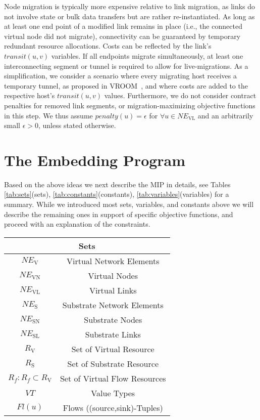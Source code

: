 \documentclass[conference,10pt]{IEEEtran}
\newcommand{\mrm}{\mathrm}
\begin{document}
Node migration is typically more expensive relative to
link migration, as links do not involve state or bulk data transfers
but are rather re-instantiated.
As long as at least one end point of a modified link remains in place (i.e., the connected virtual node did not migrate), connectivity can be guaranteed by temporary redundant resource allocations. Costs can be reflected by the link's $transit(u,v)$ variables.
If all endpoints migrate simultaneously, at least one interconnecting segment or tunnel is required to allow for live-migrations.
As a simplification, we consider a scenario where every migrating host receives a temporary tunnel, as proposed in VROOM~\cite{vroom}, and where costs are added to the respective host's $transit(u,v)$ values.
Furthermore, we do not consider contract penalties for removed link segments, or migration-maximizing objective functions in this step.
We thus assume $penalty(u)=\epsilon$ for $\forall u\in NE_{\mrm{VL}}$ and an arbitrarily small $\epsilon>0$, unless stated otherwise.

\section{The Embedding Program}\label{sec:map:prog}

Based on the above ideas we next describe the MIP in details, see
Tables \ref{tab:sets}(sets), \ref{tab:constants}(constants), \ref{tab:variables}(variables) for a summary.
While we introduced most sets, variables, and constants above we will describe the remaining ones in support of specific objective functions, and proceed with an explanation of the constraints.

\begin{table*} [th]
\begin{center}
\begin{scriptsize}
\begin{tabular}{ | c | c |}
\hline
\multicolumn{2}{|c|}{Sets} \\
\hline
  $NE_\mrm{V}$ & Virtual Network Elements\\
  $NE_{\mrm{VN}}$ & Virtual Nodes\\
  $NE_{\mrm{VL}}$ & Virtual Links\\
  $NE_\mrm{S}$ & Substrate Network Elements\\
  $NE_{\mrm{SN}}$ & Substrate Nodes\\
  $NE_{\mrm{SL}}$ & Substrate Links\\
  $R_\mrm{V}$ & Set of Virtual Resource\\
  $R_\mrm{S}$ & Set of Substrate Resource\\
  $R_f: R_f \subset R_\mrm{V}$ & Set of Virtual Flow Resources\\
  $VT$ & Value Types\\
  $Fl(u)$ & Flows ((source,sink)-Tuples)\\
  \hline
\end{tabular}\label{sets}
\end{scriptsize}
\end{center}
\caption{Set definitions\label{tab:sets}}
\end{table*}
\end{document}
